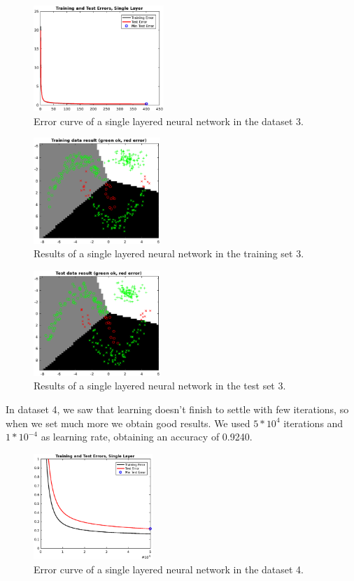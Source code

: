 \documentclass{article}
\begin{document}
\begin{figure}[H]
\centering
\includegraphics[height=4cm]{images/single_data3_error}
\caption{Error curve of a single layered neural network in the dataset 3.}
\label{fig:single_data3_error}
\end{figure}

\begin{figure}[H]
\centering
\includegraphics[height=4cm]{images/single_data3_result_train}
\caption{Results of a single layered neural network in the training set 3.}
\label{fig:single_data3_result_train}
\end{figure}

\begin{figure}[H]
\centering
\includegraphics[height=4cm]{images/single_data3_result_test}
\caption{Results of a single layered neural network in the test set 3.}
\label{fig:single_data3_result_test}
\end{figure}


In dataset 4, we saw that learning doesn't finish to settle with few iterations, so when we set much more we obtain good results. We used $5*10^4$ iterations and $1*10^{-4}$ as learning rate, obtaining an accuracy of 0.9240.

\begin{figure}[H]
\centering
\includegraphics[height=4cm]{images/single_data4_error}
\caption{Error curve of a single layered neural network in the dataset 4.}
\label{fig:single_data4_error}
\end{figure}
\end{document}
